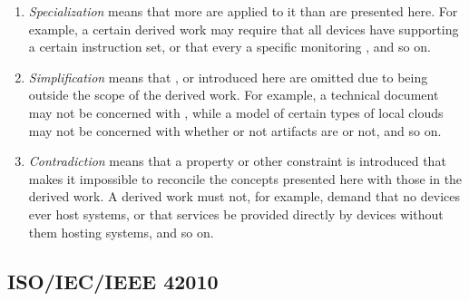 \begin{enumerate}
\begin{enumerate}
	\item \textit{Specialization} means that more  are applied to it than are presented here. For example, a certain derived work may require that all devices have  supporting a certain instruction set, or that every   a specific monitoring , and so on.
	\item \textit{Simplification} means that ,  or  introduced here are omitted due to being outside the scope of the derived work. For example, a technical document may not be concerned with , while a model of certain types of local clouds may not be concerned with whether or not artifacts are  or not, and so on.
	\item \textit{Contradiction} means that a property or other constraint is introduced that makes it impossible to reconcile the concepts presented here with those in the derived work. A derived work must not, for example, demand that no devices ever host systems, or that services be provided directly by devices without them hosting systems, and so on.
	\end{enumerate}
\end{enumerate}

\subsection{ISO/IEC/IEEE 42010}
\label{sec:conformance:iso42010}